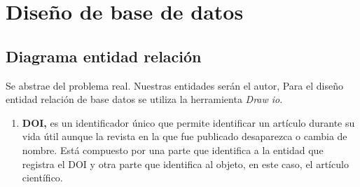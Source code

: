 \chapter*{Diseño de base de datos}
\section{Diagrama entidad relación}
Se abstrae del problema real. Nuestras entidades serán el autor, 
Para el diseño entidad relación de base datos se utiliza la herramienta \textit{Draw io}. 

\begin{enumerate}
\item \textbf{DOI,} es un identificador único que permite identificar un artículo durante su vida útil aunque la revista en la que fue publicado desaparezca o cambia de nombre. Está compuesto por una parte que identifica a la entidad que registra el DOI y otra parte que identifica al objeto, en este caso, el artículo científico.
\end{enumerate}


